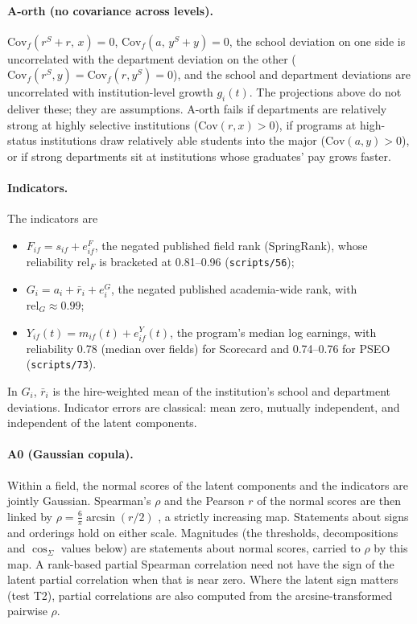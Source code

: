 \documentclass[11pt]{article}
\begin{document}
\paragraph{A-orth (no covariance across levels).} $\mathrm{Cov}_f(r^S+r,\,x)=0$,
$\mathrm{Cov}_f(a,\,y^S+y)=0$, the school deviation on one side is uncorrelated with the department deviation on
the other ($\mathrm{Cov}_f(r^S,y)=\mathrm{Cov}_f(r,y^S)=0$), and the school and department deviations are
uncorrelated with institution-level growth $g_i(t)$. The projections above do not deliver these; they are
assumptions. A-orth fails if departments
are relatively strong at highly selective institutions ($\mathrm{Cov}(r,x)>0$), if programs at high-status
institutions draw relatively able students into the major ($\mathrm{Cov}(a,y)>0$), or if strong departments sit at
institutions whose graduates' pay grows faster.

\paragraph{Indicators.} The indicators are
\begin{itemize}
\item $F_{if}=s_{if}+e^F_{if}$, the negated published field rank (SpringRank), whose reliability
$\mathrm{rel}_F$ is bracketed at 0.81--0.96 (\texttt{scripts/56});
\item $G_i=a_i+\bar r_i+e^G_i$, the negated published academia-wide rank, with $\mathrm{rel}_G\approx0.99$;
\item $Y_{if}(t)=m_{if}(t)+e^Y_{if}(t)$, the program's median log earnings, with reliability 0.78 (median over
fields) for Scorecard and 0.74--0.76 for PSEO (\texttt{scripts/73}).
\end{itemize}
In $G_i$, $\bar r_i$ is the hire-weighted mean of the institution's school and department deviations. Indicator
errors are classical: mean zero, mutually independent, and independent of the latent components.

\paragraph{A0 (Gaussian copula).} Within a field, the normal scores of the latent components and the indicators
are jointly Gaussian. Spearman's $\rho$ and the Pearson $r$ of the normal scores are then linked by
$\rho=\tfrac{6}{\pi}\arcsin(r/2)$ \citep{kruskal1958ordinal}, a strictly increasing map. Statements about signs
and orderings hold on either scale. Magnitudes (the thresholds, decompositions and $\cos_\Sigma$ values below) are
statements about normal scores, carried to $\rho$ by this map. A rank-based partial Spearman correlation need not
have the sign of the latent partial correlation when that is near zero. Where the latent sign matters (test T2),
partial correlations are also computed from the arcsine-transformed pairwise $\rho$.
\end{document}
